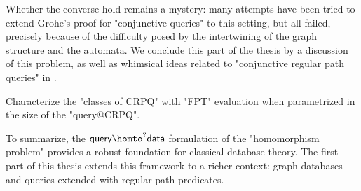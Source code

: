 Whether the converse hold remains a mystery: many attempts
have been tried to extend Grohe's proof for "conjunctive queries" to this setting,
but all failed, precisely because of the difficulty posed
by the intertwining of the graph structure and the automata.
We conclude this part of the thesis by a discussion of this problem,
as well as whimsical ideas related to "conjunctive regular path queries"
in .

\begin{openproblemintro}
	Characterize the "classes of CRPQ" with "FPT" evaluation
	when parametrized in the size of the "query@CRPQ".
\end{openproblemintro}

To summarize, the $\textsf{query} \homto^? \textsf{data}$ formulation of the "homomorphism problem" provides a robust foundation for classical database theory. The first part of this thesis extends this framework to a richer context: graph databases and queries extended with regular path predicates.